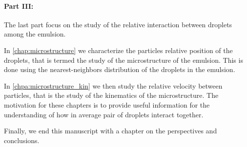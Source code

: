 \paragraph*{Part III:} 
The last part  focus on the study of the relative interaction between droplets among the emulsion. 


In \ref{chap:microstructure} we characterize the particles relative position of the droplets, that is termed the study of the microstructure of the emulsion. 
This is done using the nearest-neighbors distribution of the droplets in the emulsion. 

In \ref{chpa:microstructure_kin} we then study the relative velocity between particles, that is the study of the kinematics   of the microstructure. 
The motivation for these  chapters is to provide useful information for the understanding of how in average pair of droplets interact together. 




Finally, we end this manuscript with a chapter on the perspectives and conclusions. 